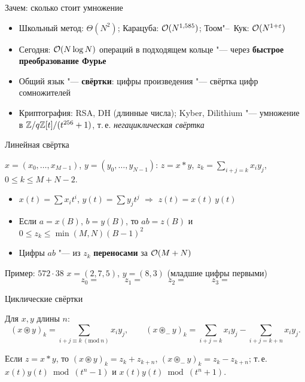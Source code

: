 \documentclass{ca-slides}
\author{}
\begin{document}
\titleframe

\begin{canvasframe}{Зачем: сколько стоит умножение}
  \begin{itemize}
    \item Школьный метод: $\Theta(N^2)$; Карацуба: $\mathcal{O}(N^{1{,}585})$;
      Тоом"--~Кук: $\mathcal{O}(N^{1+\varepsilon})$
    \item Сегодня: $\mathcal{O}(N \log N)$ операций в подходящем кольце "--- через
      \textbf{быстрое преобразование Фурье}
    \item Общий язык "--- \textbf{свёртки}: цифры произведения "--- свёртка цифр сомножителей
    \item Криптография: RSA, DH (длинные числа); Kyber, Dilithium "--- умножение в
      $\mathbb{Z}/q\mathbb{Z}[t]/(t^{256} + 1)$, т.\,е. \emph{негациклическая свёртка}
  \end{itemize}
\end{canvasframe}

\begin{canvasframe}{Линейная свёртка}
  \begin{definition}
    $x = (x_0, \dots, x_{M-1})$, $y = (y_0, \dots, y_{N-1})$:\quad
    $z = x * y$, \quad $z_k = \sum_{i + j = k} x_i y_j$, \quad $0 \le k \le M + N - 2$.
  \end{definition}
  \begin{itemize}
    \item $x(t) = \sum x_i t^i$, $y(t) = \sum y_j t^j$ $\Rightarrow$ $z(t) = x(t)\,y(t)$
    \item Если $a = x(B)$, $b = y(B)$, то $ab = z(B)$ и $0 \le z_k \le \min(M, N)(B-1)^2$
    \item Цифры $ab$ "--- из $z_k$ \textbf{переносами} за $\mathcal{O}(M + N)$
  \end{itemize}
  \penspace[0.12\textheight]
\end{canvasframe}

\begin{canvasframe}{Пример: $572 \cdot 38$}
  $x = (2, 7, 5)$, $y = (8, 3)$ (младшие цифры первыми)
  \[
    z_0 = \quad\qquad z_1 = \quad\qquad z_2 = \quad\qquad z_3 =
  \]
  \notearea[0.45\textheight]
\end{canvasframe}

\begin{canvasframe}{Циклические свёртки}
  \small
  \begin{definition}
    Для $x, y$ длины $n$:
    \[
      (x \circledast y)_k = \sum_{i + j \equiv k\ (\mathrm{mod}\ n)} x_i y_j, \qquad
      (x \circledast_{-} y)_k = \sum_{i + j = k} x_i y_j - \sum_{i + j = k + n} x_i y_j .
    \]
  \end{definition}
  \begin{lemma}
    Если $z = x * y$, то $(x \circledast y)_k = z_k + z_{k+n}$, $(x \circledast_{-} y)_k = z_k - z_{k+n}$;
    т.\,е. $x(t)y(t) \bmod (t^n - 1)$ и $x(t)y(t) \bmod (t^n + 1)$.
  \end{lemma}
\end{canvasframe}
\end{document}
